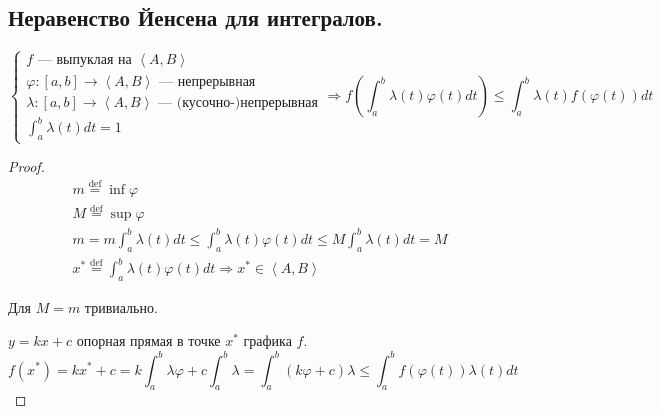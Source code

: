 \documentclass[../main.tex]{subfiles}
\begin{document}
\subsection{Неравенство Йенсена для интегралов. }
\begin{equation*}
    \begin{cases}
        f\text{~--- выпуклая на }\left<A,B\right>\\
        \varphi:[a,b]\to\left<A,B\right>\text{~--- непрерывная}\\
        \lambda:[a,b]\to\left<A,B\right>\text{~--- (кусочно-)непрерывная}\\
        \int_a^b\lambda(t)dt=1
    \end{cases}
    \Rightarrow
    f\left(\int_a^b \lambda(t)\varphi(t)dt\right)\le
    \int_a^b \lambda(t)f(\varphi(t))dt
\end{equation*}
\begin{proof}
\begin{gather*}
    m\overset{\text{def}}{=}\inf \varphi \\
    M\overset{\text{def}}{=}\sup \varphi \\
    m =
    m \int_a^b\lambda(t)dt \le
    \int_a^b\lambda(t)\varphi(t)dt \le
    M\int_a^b\lambda(t)dt = M \\
    x^* \overset{\text{def}}{=} \int_a^b\lambda(t)\varphi(t)dt \Rightarrow x^*\in\left<A,B\right>
\end{gather*}

Для $M=m$ тривиально.

$y=kx+c$ опорная прямая в точке $x^*$ графика $f$.
\begin{equation*}
    f(x^*)=kx^*+c=k\int_a^b\lambda\varphi+c\int_a^b\lambda=
    \int_a^b (k\varphi+c)\lambda \le
    \int_a^b f(\varphi(t))\lambda(t)dt
\end{equation*}
\end{proof}
\newpage


\end{document}

